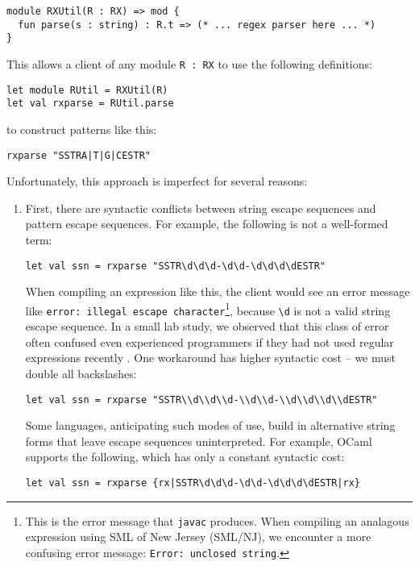 \begin{lstlisting}[numbers=none]
module RXUtil(R : RX) => mod {
  fun parse(s : string) : R.t => (* ... regex parser here ... *)
}
\end{lstlisting}
This allows a client of any module \lstinline{R : RX} to use the following definitions:
\begin{lstlisting}[numbers=none]
let module RUtil = RXUtil(R)
let val rxparse = RUtil.parse
\end{lstlisting}
to construct patterns like this:
\begin{lstlisting}[numbers=none]
rxparse "SSTRA|T|G|CESTR"
\end{lstlisting}
Unfortunately, this approach is imperfect for several reasons:
\begin{enumerate} 
\item First, there are syntactic conflicts between string escape sequences and pattern escape sequences. For example, the following is not a well-formed term:
\begin{lstlisting}[numbers=none,mathescape=|]
let val ssn = rxparse "SSTR\d\d\d-\d\d-\d\d\d\dESTR"
\end{lstlisting}
When compiling an expression like this, the client would see an error message like \verb|error: illegal escape character|\footnote{This is the error message that \texttt{javac} produces. When compiling an analagous expression using SML of New Jersey (SML/NJ), we encounter a more confusing error message: \texttt{Error: unclosed string}.}, because \verb|\d| is not a valid string escape sequence. In a small lab study, we observed that this class of error often confused even experienced programmers if they had not used regular expressions recently \cite{Omar:2012:ACC:2337223.2337324}. One workaround has higher syntactic cost -- we must double all backslashes:
\begin{lstlisting}[numbers=none]
let val ssn = rxparse "SSTR\\d\\d\\d-\\d\\d-\\d\\d\\d\\dESTR"
\end{lstlisting}

Some languages, anticipating such modes of use, build in alternative string forms that leave escape sequences uninterpreted. For example, OCaml supports the following, which has only a constant syntactic cost:
\begin{lstlisting}[numbers=none]
let val ssn = rxparse {rx|SSTR\d\d\d-\d\d-\d\d\d\dESTR|rx}
\end{lstlisting}


\end{enumerate}
